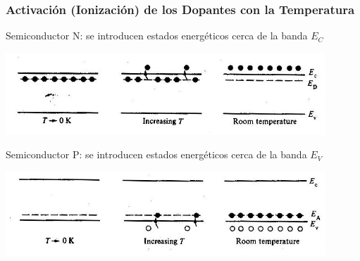 \documentclass[10pt,t,aspectratio=169]{beamer}
\begin{document}
\begin{frame}[t]
  \frametitle{Activación (Ionización) de los Dopantes con la Temperatura}

  \centering
  Semiconductor N: se introducen estados energéticos cerca de la banda $E_C$

  \includegraphics[width=12cm]{./figures/ionizacion1.jpg}

  Semiconductor P: se introducen estados energéticos cerca de la banda $E_V$

  \includegraphics[width=12cm]{./figures/ionizacion2.jpg}
\end{frame}
\end{document}
